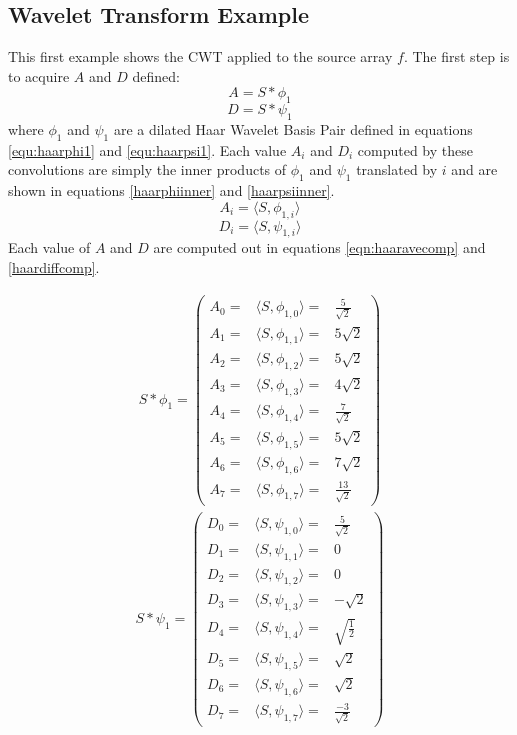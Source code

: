 \subsection {Wavelet Transform Example}
This first example shows the CWT applied to the source array $f$.  
The first step is to acquire $A$ and $D$ defined:
\[A = S \ast \phi_1 \]
\[D = S \ast \psi_1 \] 
where $\phi_1$ and $\psi_1$ are a dilated Haar Wavelet Basis Pair defined in equations \ref{equ:haarphi1} and \ref{equ:haarpsi1}.   Each value $A_i$ and $D_i$ computed by these convolutions are simply the inner products of $\phi_1$ and $\psi_1$ translated by $i$ and are shown in equations \ref{haarphiinner} and \ref{haarpsiinner}.
\begin{equation}
\label {haarphiinner}
A_i = \langle S, \phi_{1,i} \rangle
\end{equation}
\begin{equation}
\label {haarpsiinner}
D_i = \langle S, \psi_{1,i} \rangle
\end{equation}
Each value of $A$ and $D$ are computed out in equations \ref{eqn:haaravecomp} and \ref{haardiffcomp}.  

\begin{eqnarray}
\label{eqn:haaravecomp}
S \ast \phi_1 =
\left(\begin{array}{ccc}
A_0  = & \langle S, \phi_{1, 0} \rangle = & \frac{5}{\sqrt{2}} \\
A_1  = & \langle S, \phi_{1, 1} \rangle = & 5\sqrt{2} \\
A_2  = & \langle S, \phi_{1, 2} \rangle = & 5\sqrt{2} \\
A_3  = & \langle S, \phi_{1, 3} \rangle = & 4\sqrt{2} \\
A_4  = & \langle S, \phi_{1, 4} \rangle = & \frac{7}{\sqrt{2}} \\
A_5  = & \langle S, \phi_{1, 5} \rangle = & 5\sqrt{2} \\
A_6  = & \langle S, \phi_{1, 6} \rangle = & 7\sqrt{2} \\
A_7  = & \langle S, \phi_{1, 7} \rangle = & \frac{13}{\sqrt{2} }
\end{array}\right)
\end{eqnarray}
\begin{eqnarray}
\label {haardiffcomp}
S \ast \psi_1 = \left(\begin{array}{ccc}
D_0 =& \langle S, \psi_{1, 0} \rangle=& \frac{5}{\sqrt{2}} \\
D_1=& \langle S, \psi_{1, 1} \rangle=& 0 \\
D_2=& \langle S, \psi_{1, 2} \rangle=& 0 \\
D_3=& \langle S, \psi_{1, 3} \rangle=& -{\sqrt{2}} \\
D_4=& \langle S, \psi_{1, 4} \rangle=& \sqrt{\frac{1}{2}} \\
D_5=& \langle S, \psi_{1, 5} \rangle=& \sqrt{2} \\
D_6=& \langle S, \psi_{1, 6} \rangle=& \sqrt{2} \\
D_7=& \langle S, \psi_{1, 7} \rangle=& \frac{-3}{\sqrt{2}}\end{array}\right)
\end {eqnarray}

